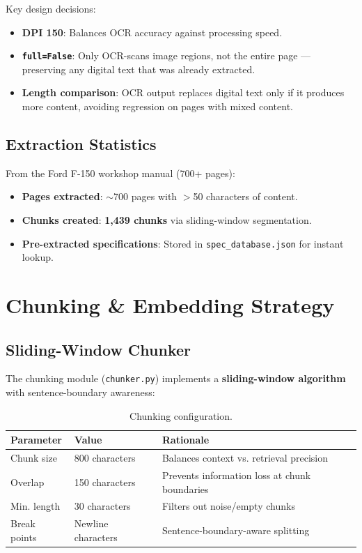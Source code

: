 \documentclass[12pt, a4paper]{article}
\begin{document}
Key design decisions:
\begin{itemize}[itemsep=2pt]
  \item \textbf{DPI 150}: Balances OCR accuracy against processing speed.
  \item \textbf{\texttt{full=False}}: Only OCR-scans image regions, not the entire page — preserving any digital text that was already extracted.
  \item \textbf{Length comparison}: OCR output replaces digital text only if it produces more content, avoiding regression on pages with mixed content.
\end{itemize}

\subsection{Extraction Statistics}

From the Ford F-150 workshop manual (700+ pages):
\begin{itemize}
  \item \textbf{Pages extracted}: $\sim$700 pages with $>$50 characters of content.
  \item \textbf{Chunks created}: \textbf{1,439 chunks} via sliding-window segmentation.
  \item \textbf{Pre-extracted specifications}: Stored in \texttt{spec\_database.json} for instant lookup.
\end{itemize}

\section{Chunking \& Embedding Strategy}

\subsection{Sliding-Window Chunker}

The chunking module (\texttt{chunker.py}) implements a \textbf{sliding-window algorithm} with sentence-boundary awareness:

\begin{table}[H]
\centering
\caption{Chunking configuration.}
\begin{tabular}{l l l}
\toprule
\textbf{Parameter} & \textbf{Value} & \textbf{Rationale} \\
\midrule
Chunk size    & 800 characters & Balances context vs. retrieval precision \\
Overlap       & 150 characters & Prevents information loss at chunk boundaries \\
Min. length   & 30 characters  & Filters out noise/empty chunks \\
Break points  & Newline characters & Sentence-boundary-aware splitting \\
\bottomrule
\end{tabular}
\end{table}
\end{document}
